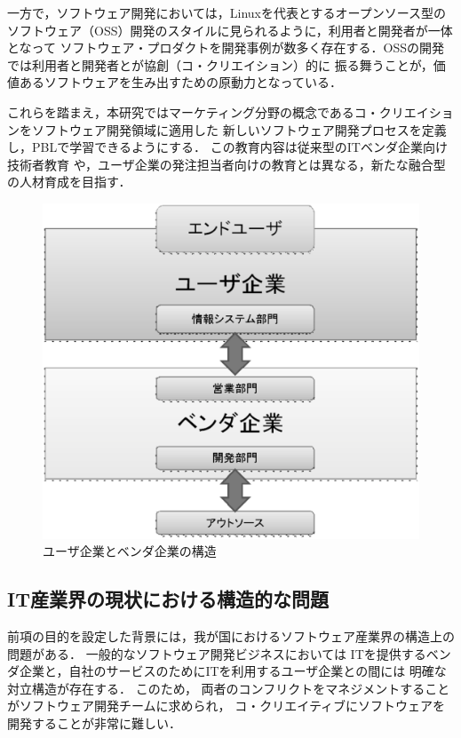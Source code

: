 \documentclass[a4j,9pt,twoside,twocolumn]{jsarticle}
\begin{document}
    一方で，ソフトウェア開発においては，Linuxを代表とするオープンソース型の
    ソフトウェア（OSS）開発のスタイルに見られるように，利用者と開発者が一体となって
    ソフトウェア・プロダクトを開発事例が数多く存在する．OSSの開発では利用者と開発者とが協創（コ・クリエイション）的に
    振る舞うことが，価値あるソフトウェアを生み出すための原動力となっている\cite{oss}．
    
    これらを踏まえ，本研究ではマーケティング分野の概念であるコ・クリエイションをソフトウェア開発領域に適用した
    新しいソフトウェア開発プロセスを定義し，PBLで学習できるようにする．
    この教育内容は従来型のITベンダ企業向け技術者教育
    や，ユーザ企業の発注担当者向けの教育とは異なる，新たな融合型の人材育成を目指す．
    
\begin{figure}
\begin{center}
\includegraphics[width=\linewidth]{figs/user_vendor_model.eps}
\caption{ユーザ企業とベンダ企業の構造}
\label{fig:user_vendor_model}
\end{center}
\end{figure}
	
\subsection{IT産業界の現状における構造的な問題}
    前項の目的を設定した背景には，我が国におけるソフトウェア産業界の構造上の問題がある．
	一般的なソフトウェア開発ビジネスにおいては    
    ITを提供するベンダ企業と，自社のサービスのためにITを利用するユーザ企業との間には
    明確な対立構造が存在する．
    このため，
    両者のコンフリクトをマネジメントすることがソフトウェア開発チームに求められ，
    コ・クリエイティブにソフトウェアを開発することが非常に難しい．
    
\end{document}

